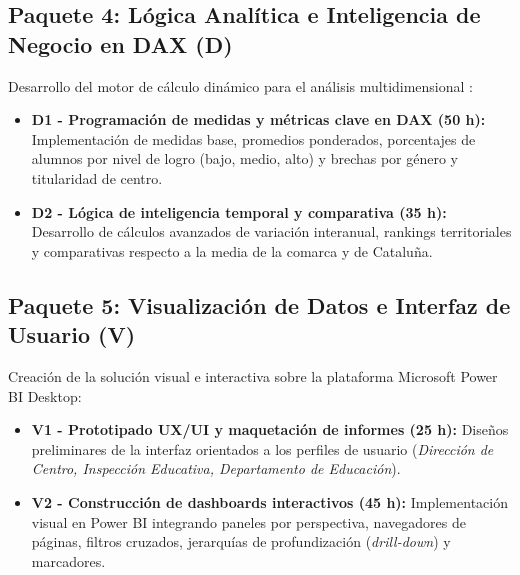 \documentclass[12pt, a4paper, twoside]{report}
\begin{document}
\subsection{Paquete 4: Lógica Analítica e Inteligencia de Negocio en DAX (D)}
Desarrollo del motor de cálculo dinámico para el análisis multidimensional \cite{ferrari2016definitive}:
\begin{itemize} [itemsep = 9pt]
    \item \textbf{D1 - Programación de medidas y métricas clave en DAX (50 h):} Implementación de medidas base, promedios ponderados, porcentajes de alumnos por nivel de logro (bajo, medio, alto) y brechas por género y titularidad de centro.
    \item \textbf{D2 - Lógica de inteligencia temporal y comparativa (35 h):} Desarrollo de cálculos avanzados de variación interanual, rankings territoriales y comparativas respecto a la media de la comarca y de Cataluña.
\end{itemize}

\subsection{Paquete 5: Visualización de Datos e Interfaz de Usuario (V)}
Creación de la solución visual e interactiva sobre la plataforma Microsoft Power BI Desktop:
\begin{itemize} [itemsep = 9pt]
    \item \textbf{V1 - Prototipado UX/UI y maquetación de informes (25 h):} Diseños preliminares de la interfaz orientados a los perfiles de usuario (\textit{Dirección de Centro, Inspección Educativa, Departamento de Educación}).
    \item \textbf{V2 - Construcción de dashboards interactivos (45 h):} Implementación visual en Power BI integrando paneles por perspectiva, navegadores de páginas, filtros cruzados, jerarquías de profundización (\textit{drill-down}) y marcadores.
\end{itemize}
\end{document}
